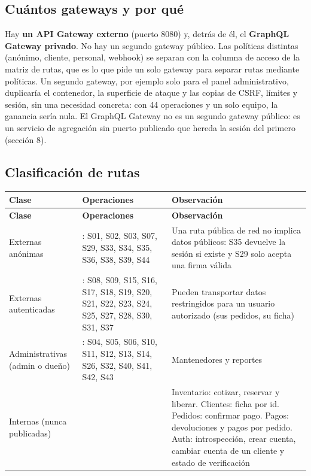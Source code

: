 \subsection{Cuántos gateways y por qué}

Hay \textbf{un API Gateway externo} (puerto 8080) y, detrás de él, el \textbf{GraphQL Gateway privado}. No hay un segundo gateway público. Las políticas distintas (anónimo, cliente, personal, webhook) se separan con la columna de acceso de la matriz de rutas, que es lo que pide un solo gateway para separar rutas mediante políticas. Un segundo gateway, por ejemplo solo para el panel administrativo, duplicaría el contenedor, la superficie de ataque y las copias de CSRF, límites y sesión, sin una necesidad concreta: con 44 operaciones y un solo equipo, la ganancia sería nula. El GraphQL Gateway no es un segundo gateway público: es un servicio de agregación sin puerto publicado que hereda la sesión del primero (sección 8).


\subsection{Clasificación de rutas}

{\small
\setlength{\tabcolsep}{3pt}\renewcommand{\arraystretch}{1.15}
\begin{longtable}{|>{\raggedright\arraybackslash}p{}|>{\raggedright\arraybackslash}p{}|>{\raggedright\arraybackslash}p{}|}
\hline
\textbf{Clase} & \textbf{Operaciones} & \textbf{Observación} \\ \hline
\endfirsthead
\hline
\textbf{Clase} & \textbf{Operaciones} & \textbf{Observación} \\ \hline
\endhead
Externas anónimas & 12: S01, S02, S03, S07, S29, S33, S34, S35, S36, S38, S39, S44 & Una ruta pública de red no implica datos públicos: S35 devuelve la sesión si existe y S29 solo acepta una firma válida \\ \hline
Externas autenticadas & 18: S08, S09, S15, S16, S17, S18, S19, S20, S21, S22, S23, S24, S25, S27, S28, S30, S31, S37 & Pueden transportar datos restringidos para un usuario autorizado (sus pedidos, su ficha) \\ \hline
Administrativas (admin o dueño) & 14: S04, S05, S06, S10, S11, S12, S13, S14, S26, S32, S40, S41, S42, S43 & Mantenedores y reportes \\ \hline
Internas (nunca publicadas) & 11 & Inventario: cotizar, reservar y liberar. Clientes: ficha por id. Pedidos: confirmar pago. Pagos: devoluciones y pagos por pedido. Auth: introspección, crear cuenta, cambiar cuenta de un cliente y estado de verificación \\ \hline
\end{longtable}
}

